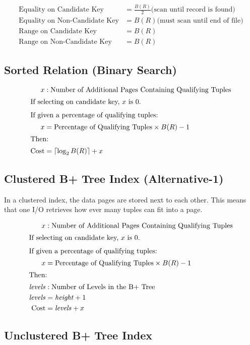\documentclass{article}
\newcommand{\ceil}[1]{\left\lceil#1\right\rceil}
\begin{document}
\begin{align}
  \text{Equality on Candidate Key} &= \frac{B(R)}{2} \text{(scan until record is found)} \\
  \text{Equality on Non-Candidate Key} &= B(R) \text{(must scan until end of file)} \\
  \text{Range on Candidate Key} &= B(R) \\
  \text{Range on Non-Candidate Key} &= B(R)
\end{align}

\subsection{Sorted Relation (Binary Search)}
\label{sec:sorted}

\begin{align}
  x &: \text{Number of Additional Pages Containing Qualifying Tuples} \notag \\
  \intertext{If selecting on candidate key, \(x\) is 0.}
  \intertext{If given a percentage of qualifying tuples:}
  x &= \text{Percentage of Qualifying Tuples} \times B(R) - 1 \\
  \intertext{Then:}
  \text{Cost} &= \ceil{\log_2B(R)} + x
\end{align}

\subsection{Clustered B+ Tree Index (Alternative-1)}
\label{sec:clustered-b+-tree}

In a clustered index, the data pages are stored next to each
other. This means that one I/O retrieves how ever many tuples can fit
into a page.

\begin{align}
  x &: \text{Number of Additional Pages Containing Qualifying Tuples} \notag \\
  \intertext{If selecting on candidate key, \(x\) is 0.}
  \intertext{If given a percentage of qualifying tuples:}
  x &= \text{Percentage of Qualifying Tuples} \times B(R) - 1 \\
  \intertext{Then:}
  \mathit{levels} &: \text{Number of Levels in the B+ Tree} \notag \\
  \mathit{levels} &= \mathit{height} + 1 \\
  \text{Cost} &= \mathit{levels} + x
\end{align}

\subsection{Unclustered B+ Tree Index}
\end{document}
